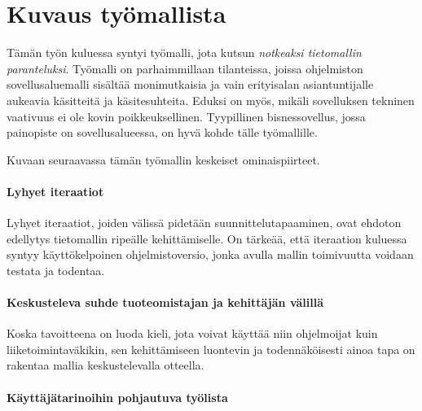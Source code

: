 \pagebreak

\hypertarget{kuvaus-tyuxf6mallista}{%
\chapter{Kuvaus työmallista}\label{kuvaus-tyuxf6mallista}}

Tämän työn kuluessa syntyi työmalli, jota kutsun \emph{notkeaksi
tietomallin paranteluksi}. Työmalli on parhaimmillaan tilanteissa,
joissa ohjelmiston sovellusaluemalli sisältää monimutkaisia ja vain
erityisalan asiantuntijalle aukeavia käsitteitä ja käsitesuhteita.
Eduksi on myös, mikäli sovelluksen tekninen vaativuus ei ole kovin
poikkeuksellinen. Tyypillinen bisnessovellus, jossa painopiste on
sovellusalueessa, on hyvä kohde tälle työmallille.

Kuvaan seuraavassa tämän työmallin keskeiset ominaispiirteet.

\hypertarget{lyhyet-iteraatiot}{%
\subsubsection{Lyhyet iteraatiot}\label{lyhyet-iteraatiot}}

Lyhyet iteraatiot, joiden välissä pidetään suunnittelutapaaminen, ovat
ehdoton edellytys tietomallin ripeälle kehittämiselle. On tärkeää, että
iteraation kuluessa syntyy käyttökelpoinen ohjelmistoversio, jonka
avulla mallin toimivuutta voidaan testata ja todentaa.

\hypertarget{keskusteleva-suhde-tuoteomistajan-ja-kehittuxe4juxe4n-vuxe4lilluxe4}{%
\subsubsection{Keskusteleva suhde tuoteomistajan ja kehittäjän
välillä}\label{keskusteleva-suhde-tuoteomistajan-ja-kehittuxe4juxe4n-vuxe4lilluxe4}}

Koska tavoitteena on luoda kieli, jota voivat käyttää niin ohjelmoijat
kuin liiketoimintaväkikin, sen kehittämiseen luontevin ja
todennäköisesti ainoa tapa on rakentaa mallia keskustelevalla otteella.

\hypertarget{kuxe4yttuxe4juxe4tarinoihin-pohjautuva-tyuxf6lista}{%
\subsubsection{Käyttäjätarinoihin pohjautuva
työlista}\label{kuxe4yttuxe4juxe4tarinoihin-pohjautuva-tyuxf6lista}}

